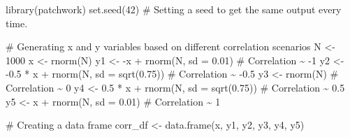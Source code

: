 \documentclass[
  letterpaper,
  DIV=11,
  numbers=noendperiod]{scrreprt}
\newenvironment{Shaded}{\begin{snugshade}}{\end{snugshade}}
\newcommand{\AttributeTok}[1]{\textcolor[rgb]{0.40,0.45,0.13}{#1}}
\newcommand{\CommentTok}[1]{\textcolor[rgb]{0.37,0.37,0.37}{#1}}
\newcommand{\DecValTok}[1]{\textcolor[rgb]{0.68,0.00,0.00}{#1}}
\newcommand{\FloatTok}[1]{\textcolor[rgb]{0.68,0.00,0.00}{#1}}
\newcommand{\FunctionTok}[1]{\textcolor[rgb]{0.28,0.35,0.67}{#1}}
\newcommand{\NormalTok}[1]{\textcolor[rgb]{0.00,0.23,0.31}{#1}}
\newcommand{\OtherTok}[1]{\textcolor[rgb]{0.00,0.23,0.31}{#1}}
\newcommand{\SpecialCharTok}[1]{\textcolor[rgb]{0.37,0.37,0.37}{#1}}
\begin{document}
\begin{Shaded}
\begin{Highlighting}[]
\FunctionTok{library}\NormalTok{(patchwork)}
\FunctionTok{set.seed}\NormalTok{(}\DecValTok{42}\NormalTok{) }\CommentTok{\# Setting a seed to get the same output every time.}

\CommentTok{\# Generating x and y variables based on different correlation scenarios}
\NormalTok{N }\OtherTok{\textless{}{-}} \DecValTok{1000}
\NormalTok{x }\OtherTok{\textless{}{-}} \FunctionTok{rnorm}\NormalTok{(N)}
\NormalTok{y1 }\OtherTok{\textless{}{-}} \SpecialCharTok{{-}}\NormalTok{x }\SpecialCharTok{+} \FunctionTok{rnorm}\NormalTok{(N, }\AttributeTok{sd =} \FloatTok{0.01}\NormalTok{)  }\CommentTok{\# Correlation \textasciitilde{} {-}1}
\NormalTok{y2 }\OtherTok{\textless{}{-}} \SpecialCharTok{{-}}\FloatTok{0.5} \SpecialCharTok{*}\NormalTok{ x }\SpecialCharTok{+} \FunctionTok{rnorm}\NormalTok{(N, }\AttributeTok{sd =} \FunctionTok{sqrt}\NormalTok{(}\FloatTok{0.75}\NormalTok{))  }\CommentTok{\# Correlation \textasciitilde{} {-}0.5}
\NormalTok{y3 }\OtherTok{\textless{}{-}} \FunctionTok{rnorm}\NormalTok{(N)  }\CommentTok{\# Correlation \textasciitilde{} 0}
\NormalTok{y4 }\OtherTok{\textless{}{-}} \FloatTok{0.5} \SpecialCharTok{*}\NormalTok{ x }\SpecialCharTok{+} \FunctionTok{rnorm}\NormalTok{(N, }\AttributeTok{sd =} \FunctionTok{sqrt}\NormalTok{(}\FloatTok{0.75}\NormalTok{))  }\CommentTok{\# Correlation \textasciitilde{} 0.5}
\NormalTok{y5 }\OtherTok{\textless{}{-}}\NormalTok{ x }\SpecialCharTok{+} \FunctionTok{rnorm}\NormalTok{(N, }\AttributeTok{sd =} \FloatTok{0.01}\NormalTok{)  }\CommentTok{\# Correlation \textasciitilde{} 1}

\CommentTok{\# Creating a data frame}
\NormalTok{corr\_df }\OtherTok{\textless{}{-}} \FunctionTok{data.frame}\NormalTok{(x, y1, y2, y3, y4, y5)}


\end{Highlighting}
\end{Shaded}
\end{document}
